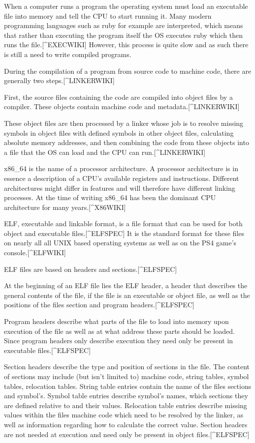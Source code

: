 \documentclass[notitlepage]{report}
\begin{document}
When a computer runs a program the operating system must load an executable file into memory and tell the CPU to start running it. Many modern programming languages such as ruby for example are interpreted, which means that rather than executing the program itself the OS executes ruby which then runs the file.[^EXECWIKI] However, this process is quite slow and as such there is still a need to write compiled programs.

During the compilation of a program from source code to machine code, there are generally two steps.[^LINKERWIKI]

First, the source files containing the code are compiled into object files by a compiler. These objects contain machine code and metadata.[^LINKERWIKI]

These object files are then processed by a linker whose job is to resolve missing symbols in object files with defined symbols in other object files, calculating absolute memory addresses, and then combining the code from these objects into a file that the OS can load and the CPU can run.[^LINKERWIKI]

x86\_64 is the name of a processor architecture. A processor architecture is in essence a description of a CPU's available registers and instructions. Different architectures might differ in features and will therefore have different linking processes. At the time of writing x86\_64 has been the dominant CPU architecture for many years.[^X86WIKI]

ELF, executable and linkable format, is a file format that can be used for both object and executable files.[^ELFSPEC] It is the standard format for these files on nearly all all UNIX based operating systems as well as on the PS4 game's console.[^ELFWIKI]

ELF files are based on headers and sections.[^ELFSPEC]

At the beginning of an ELF file lies the ELF header, a header that describes the general contents of the file, if the file is an executable or object file, as well as the positions of the files section and program headers.[^ELFSPEC]

Program headers describe what parts of the file to load into memory upon execution of the file as well as at what address these parts should be loaded. Since program headers only describe execution they need only be present in executable files.[^ELFSPEC]

Section headers describe the type and position of sections in the file. The content of sections may include (but isn't limited to) machine code, string tables, symbol tables, relocation tables. String table entries contain the name of the files sections and symbol's. Symbol table entries describe symbol's names, which sections they are defined relative to and their values. Relocation table entries describe missing values within the files machine code which need to be resolved by the linker, as well as information regarding how to calculate the correct value. Section headers are not needed at execution and need only be present in object files.[^ELFSPEC]
\end{document}
